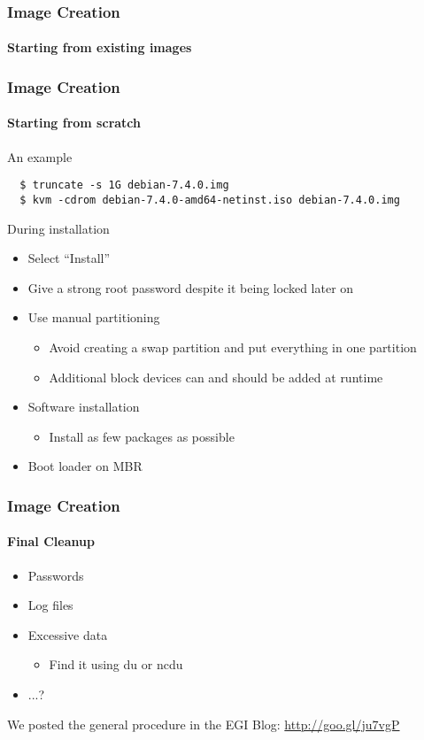 \begin{frame}
\frametitle{Image Creation}
\framesubtitle{Starting from existing images}


\end{frame}

\begin{frame}[fragile]
\frametitle{Image Creation}
\framesubtitle{Starting from scratch}
An example
\begin{lstlisting}
  $ truncate -s 1G debian-7.4.0.img
  $ kvm -cdrom debian-7.4.0-amd64-netinst.iso debian-7.4.0.img
\end{lstlisting}
During installation
\begin{itemize}
\item Select ``Install''
\item Give a strong root password despite it being locked later on
\item Use manual partitioning
  \begin{itemize}
  \item Avoid creating a swap partition and put everything in one partition
  \item Additional block devices can and should be added at runtime
  \end{itemize}
\item Software installation
  \begin{itemize}
  \item Install as few packages as possible
  \end{itemize}
\item Boot loader on MBR
\end{itemize}
\end{frame}

\begin{frame}
\frametitle{Image Creation}
\framesubtitle{Final Cleanup}
\begin{itemize}
\item Passwords
\item Log files
\item Excessive data
  \begin{itemize}
  \item Find it using du or ncdu
  \end{itemize}
\item ...?
\end{itemize}
We posted the general procedure in the EGI Blog: \url{http://goo.gl/ju7vgP}
\end{frame}


